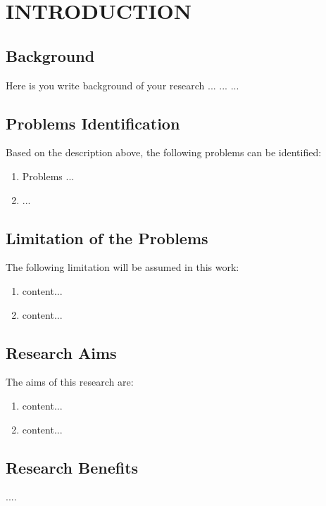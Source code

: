\chapter{INTRODUCTION}
\section{Background}
Here is you write background of your research ... ...
... 

\section{Problems Identification}
Based on the description above, the following problems can be identified:
\begin{enumerate}
	\item  Problems ...
	\item  ...
\end{enumerate}

\section{Limitation of the Problems}
The following limitation will be assumed in this work:
\begin{enumerate}
	\item content...
	\item content...
\end{enumerate}

\section{Research Aims}
The aims of this research are:
\begin{enumerate}
	\item content...
	\item content...
\end{enumerate}	
	
\section{Research Benefits}
....